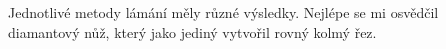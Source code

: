 Jednotlivé metody lámání měly různé výsledky.
Nejlépe se mi osvědčil diamantový nůž, který jako jediný vytvořil rovný kolmý řez.
